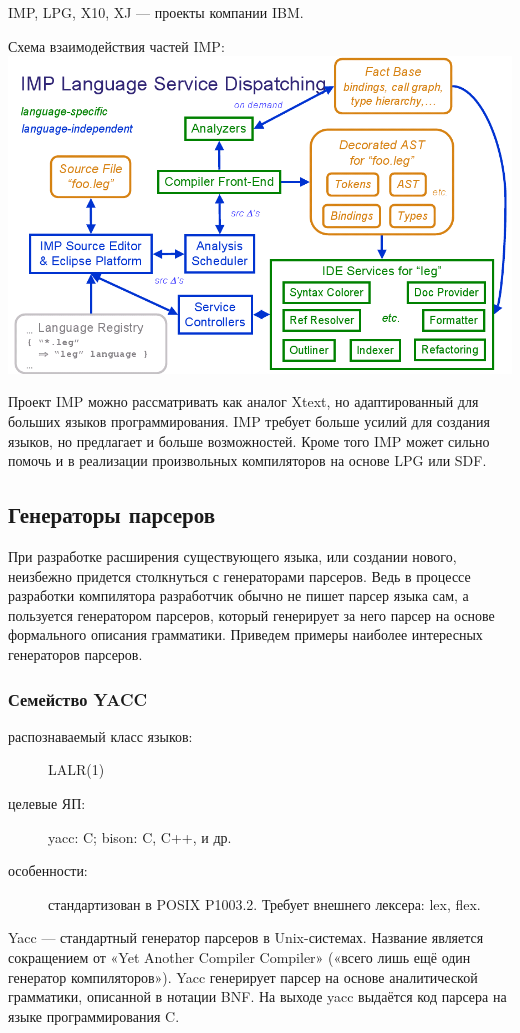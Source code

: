 \documentclass[a4paper,12pt,titlepage]{extarticle}
\begin{document}
IMP, LPG, X10, XJ --- проекты компании IBM.

\pagebreak
\begin{center}
Схема взаимодействия частей IMP:
\includegraphics[scale=0.5]{img/imp.png}
\end{center}

Проект IMP можно рассматривать как аналог Xtext, но адаптированный для больших
языков программирования. IMP требует больше усилий для создания языков, но
предлагает и больше возможностей. Кроме того IMP может сильно помочь и в
реализации произвольных компиляторов на основе LPG или SDF.

\subsection{Генераторы парсеров}
При разработке расширения существующего языка, или создании нового, неизбежно
придется столкнуться с генераторами парсеров. Ведь в процессе разработки
компилятора разработчик обычно не пишет парсер языка сам, а пользуется
генератором парсеров, который генерирует за него парсер на основе формального
описания грамматики. Приведем примеры наиболее интересных генераторов парсеров.

\subsubsection*{Семейство YACC}
\begin{description}
  \item[распознаваемый класс языков:] LALR(1)
  \item[целевые ЯП:] yacc: C; bison: C, C++, и др.
  \item[особенности:] стандартизован в POSIX P1003.2. Требует внешнего лексера: lex, flex.
\end{description}
Yacc — стандартный генератор парсеров в Unix-системах. Название является
сокращением от «Yet Another Compiler Compiler» («всего лишь ещё один генератор
компиляторов»). Yacc генерирует парсер на основе аналитической грамматики,
описанной в нотации BNF. На выходе yacc выдаётся код парсера на языке
программирования C.
\end{document}
